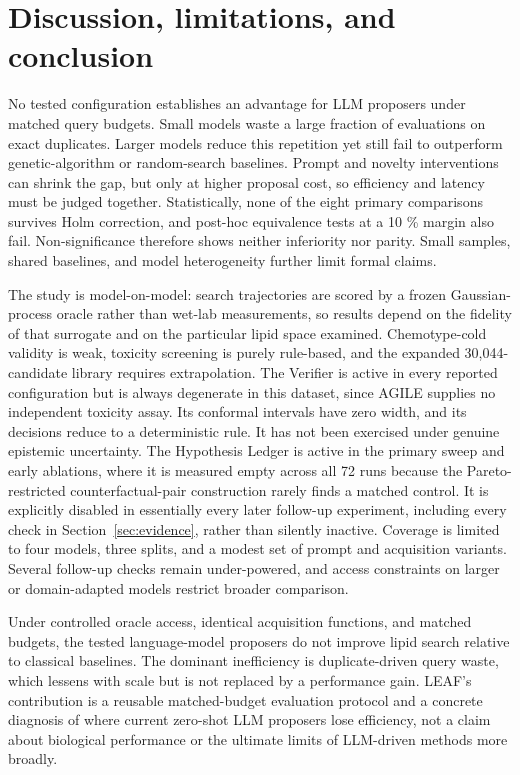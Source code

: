 \documentclass[11pt]{article}
\begin{document}
\section{Discussion, limitations, and conclusion}
\label{sec:discussion}

No tested configuration establishes an advantage for LLM proposers under matched query budgets. Small models waste a large fraction of evaluations on exact duplicates. Larger models reduce this repetition yet still fail to outperform genetic-algorithm or random-search baselines. Prompt and novelty interventions can shrink the gap, but only at higher proposal cost, so efficiency and latency must be judged together. Statistically, none of the eight primary comparisons survives Holm correction, and post-hoc equivalence tests at a 10 \% margin also fail. Non-significance therefore shows neither inferiority nor parity. Small samples, shared baselines, and model heterogeneity further limit formal claims.

The study is model-on-model: search trajectories are scored by a frozen Gaussian-process oracle rather than wet-lab measurements, so results depend on the fidelity of that surrogate and on the particular lipid space examined. Chemotype-cold validity is weak, toxicity screening is purely rule-based, and the expanded 30,044-candidate library requires extrapolation. The Verifier is active in every reported configuration but is always degenerate in this dataset, since AGILE supplies no independent toxicity assay. Its conformal intervals have zero width, and its decisions reduce to a deterministic rule. It has not been exercised under genuine epistemic uncertainty. The Hypothesis Ledger is active in the primary sweep and early ablations, where it is measured empty across all 72 runs because the Pareto-restricted counterfactual-pair construction rarely finds a matched control. It is explicitly disabled in essentially every later follow-up experiment, including every check in Section~\ref{sec:evidence}, rather than silently inactive. Coverage is limited to four models, three splits, and a modest set of prompt and acquisition variants. Several follow-up checks remain under-powered, and access constraints on larger or domain-adapted models restrict broader comparison.

Under controlled oracle access, identical acquisition functions, and matched budgets, the tested language-model proposers do not improve lipid search relative to classical baselines. The dominant inefficiency is duplicate-driven query waste, which lessens with scale but is not replaced by a performance gain. LEAF’s contribution is a reusable matched-budget evaluation protocol and a concrete diagnosis of where current zero-shot LLM proposers lose efficiency, not a claim about biological performance or the ultimate limits of LLM-driven methods more broadly.
\end{document}
